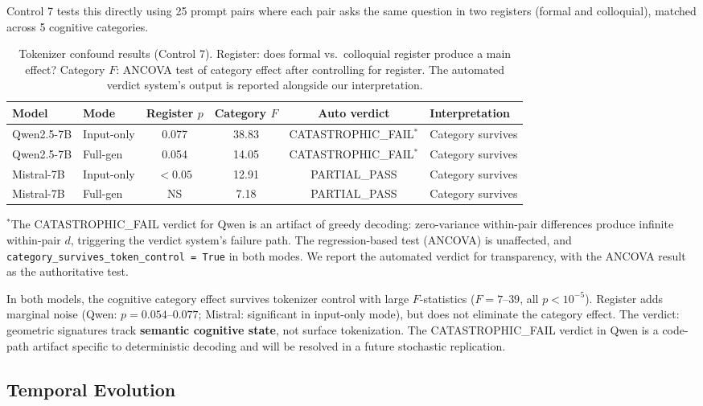 \documentclass[11pt,a4paper]{article}
\begin{document}
Control 7 tests this directly using 25 prompt pairs where each pair asks the same question in two registers (formal and colloquial), matched across 5 cognitive categories.

\begin{table}[H]
\centering
\caption{Tokenizer confound results (Control 7). Register: does formal vs.\ colloquial register produce a main effect? Category $F$: ANCOVA test of category effect after controlling for register. The automated verdict system's output is reported alongside our interpretation.}
\label{tab:tokenizer}
\begin{tabular}{llcccl}
\toprule
\textbf{Model} & \textbf{Mode} & \textbf{Register $p$} & \textbf{Category $F$} & \textbf{Auto verdict} & \textbf{Interpretation} \\
\midrule
Qwen2.5-7B & Input-only & 0.077 & 38.83 & CATASTROPHIC\_FAIL$^*$ & Category survives \\
Qwen2.5-7B & Full-gen & 0.054 & 14.05 & CATASTROPHIC\_FAIL$^*$ & Category survives \\
Mistral-7B & Input-only & $< 0.05$ & 12.91 & PARTIAL\_PASS & Category survives \\
Mistral-7B & Full-gen & NS & 7.18 & PARTIAL\_PASS & Category survives \\
\bottomrule
\end{tabular}
\end{table}

\noindent $^*$The CATASTROPHIC\_FAIL verdict for Qwen is an artifact of greedy decoding: zero-variance within-pair differences produce infinite within-pair $d$, triggering the verdict system's failure path. The regression-based test (ANCOVA) is unaffected, and \texttt{category\_survives\_token\_control = True} in both modes. We report the automated verdict for transparency, with the ANCOVA result as the authoritative test.

\medskip

In both models, the cognitive category effect survives tokenizer control with large $F$-statistics ($F = 7$--$39$, all $p < 10^{-5}$). Register adds marginal noise (Qwen: $p = 0.054$--$0.077$; Mistral: significant in input-only mode), but does not eliminate the category effect. The verdict: geometric signatures track \textbf{semantic cognitive state}, not surface tokenization. The CATASTROPHIC\_FAIL verdict in Qwen is a code-path artifact specific to deterministic decoding and will be resolved in a future stochastic replication.

\subsection{Temporal Evolution}
\label{sec:temporal}
\end{document}
